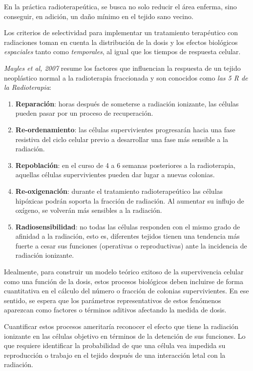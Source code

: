 \documentclass[12pt,letterpaper, oneside]{book}
\begin{document}
			En la práctica radioterapeútica, se busca no solo reducir el área enferma, sino conseguir, en adición, un daño mínimo en el tejido sano vecino\cite{Mayles.2007}. 
			
			Los criterios de selectividad para implementar un tratamiento terapéutico con radiaciones toman en cuenta la distribución de la dosis y los efectos biológicos \textit{espaciales} tanto como \textit{temporales}, al igual que los tiempos de respuesta celular\cite{Mayles.2007}.
			
			\textit{Mayles et al, 2007} resume los factores que influencian la respuesta de un tejido neoplástico normal a la radioterapia fraccionada y son conocidos como \textit{las 5 R de la Radioterapia}:
			
			\begin{enumerate}
				\item \textbf{Reparación}: horas después de someterse a radiación ionizante, las células pueden pasar por un proceso de recuperación. 
				\item \textbf{Re-ordenamiento}: las células supervivientes progresarán hacia una fase resistiva del ciclo celular previo a desarrollar una fase más sensible a la radiación. 
				\item \textbf{Repoblación}: en el curso de 4 a 6 semanas posteriores a la radioterapia, aquellas células supervivientes pueden dar lugar a nuevas colonias. 
				\item \textbf{Re-oxigenación}: durante el tratamiento radioterapeútico las células hipóxicas podrán soporta la fracción de radiación. Al aumentar su influjo de oxígeno, se volverán más sensibles a la radiación. 
				\item \textbf{Radiosensibilidad}: no todas las células responden con el mismo grado de afinidad a la radiación, esto es, diferentes tejidos tienen una tendencia más fuerte a cesar sus funciones (operativas o reproductivas) ante la incidencia de radiación ionizante. 
			\end{enumerate}
		
		Idealmente, para construir un modelo teórico exitoso de la supervivencia celular como una función de la dosis, estos procesos biológicos deben incluirse de forma cuantitativa en el cálculo del número o fracción de colonias supervivientes. En ese sentido, se espera que los parámetros representativos de estos fenómenos aparezcan como factores o términos aditivos afectando la medida de dosis. 
		
		Cuantificar estos procesos ameritaría reconocer el efecto que tiene la radiación ionizante en las células objetivo en términos de la detención de sus funciones. Lo que requiere identificar la probabilidad de que una célula vea impedida su reproducción o trabajo en el tejido después de una interacción letal con la radiación. 	
	
\end{document}
